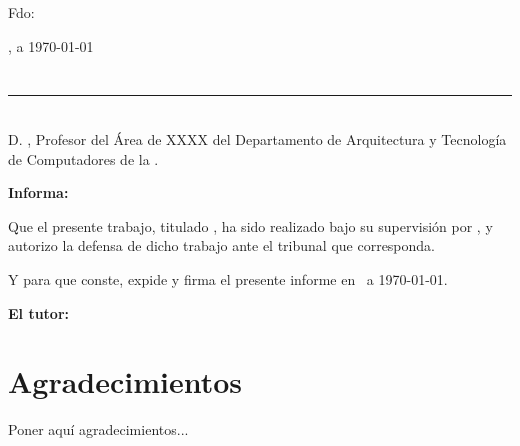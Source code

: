 \vspace{6cm}

\noindent Fdo: \autor

\vspace{2cm}

\begin{flushright}
\ciudad, a \today
\end{flushright}

\chapter*{}
\thispagestyle{empty}

\noindent\rule[-1ex]{\textwidth}{2pt}\\[4.5ex]

D. \textbf{\tutor}, Profesor del Área de XXXX del Departamento de Arquitectura y Tecnología de Computadores de la \universidad.

\vspace{0.5cm}

\vspace{0.5cm}

\textbf{Informa:}

\vspace{0.5cm}

Que el presente trabajo, titulado \textit{\textbf{\titulo}}, ha sido realizado bajo su supervisión por \textbf{\autor}, y 
autorizo la defensa de dicho trabajo ante el tribunal que corresponda.

\vspace{0.5cm}

Y para que conste, expide y firma el presente informe en \ciudad\ a \today.

\vspace{1cm}

\textbf{El tutor:}

\vspace{5cm}

\noindent \textbf{\tutor}

\chapter*{Agradecimientos}
\thispagestyle{empty}

\vspace{1cm}

Poner aquí agradecimientos...


